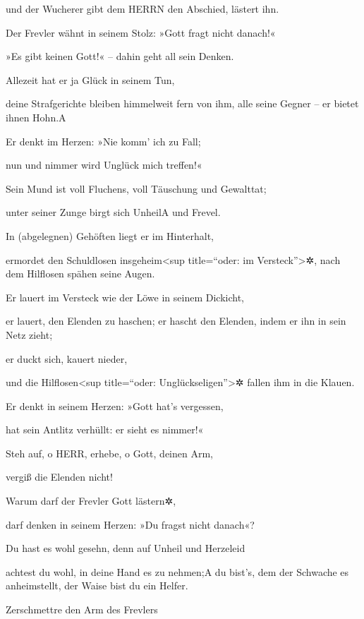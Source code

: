 und der Wucherer gibt dem HERRN den Abschied, lästert ihn.

Der Frevler wähnt in seinem Stolz: »Gott fragt nicht
danach!«

»Es gibt keinen Gott!« -- dahin geht all sein Denken.

Allezeit hat er ja Glück in seinem Tun,

deine Strafgerichte bleiben himmelweit fern von ihm, alle seine Gegner
-- er bietet ihnen Hohn.{A}

Er denkt im Herzen: »Nie komm' ich zu Fall;

nun und nimmer wird Unglück mich treffen!«

Sein Mund ist voll Fluchens, voll Täuschung und Gewalttat;

unter seiner Zunge birgt sich Unheil{A} und Frevel.

In (abgelegnen) Gehöften liegt er im Hinterhalt,

ermordet den Schuldlosen insgeheim\textless sup title=``oder: im
Versteck''\textgreater✲, nach dem Hilflosen spähen seine Augen.

Er lauert im Versteck wie der Löwe in seinem Dickicht,

er lauert, den Elenden zu haschen; er hascht den Elenden, indem er ihn
in sein Netz zieht;

er duckt sich, kauert nieder,

und die Hilflosen\textless sup title=``oder:
Unglückseligen''\textgreater✲ fallen ihm in die Klauen.

Er denkt in seinem Herzen: »Gott hat's vergessen,

hat sein Antlitz verhüllt: er sieht es nimmer!«

Steh auf, o HERR, erhebe, o Gott, deinen Arm,

vergiß die Elenden nicht!

Warum darf der Frevler Gott lästern✲,

darf denken in seinem Herzen: »Du fragst nicht danach«?

Du hast es wohl gesehn, denn auf Unheil und Herzeleid

achtest du wohl, in deine Hand es zu nehmen;{A} du bist's, dem der
Schwache es anheimstellt, der Waise bist du ein Helfer.

Zerschmettre den Arm des Frevlers

